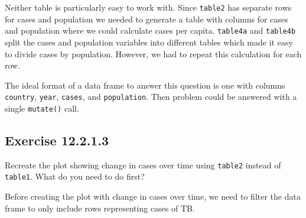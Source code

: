 \documentclass[]{book}
\newenvironment{Shaded}{\begin{snugshade}}{\end{snugshade}}
\newcommand{\CommentTok}[1]{\textcolor[rgb]{0.56,0.35,0.01}{\textit{#1}}}
\newcommand{\DataTypeTok}[1]{\textcolor[rgb]{0.13,0.29,0.53}{#1}}
\newcommand{\DecValTok}[1]{\textcolor[rgb]{0.00,0.00,0.81}{#1}}
\newcommand{\KeywordTok}[1]{\textcolor[rgb]{0.13,0.29,0.53}{\textbf{#1}}}
\newcommand{\NormalTok}[1]{#1}
\newcommand{\OperatorTok}[1]{\textcolor[rgb]{0.81,0.36,0.00}{\textbf{#1}}}
\newcommand{\StringTok}[1]{\textcolor[rgb]{0.31,0.60,0.02}{#1}}
\theoremstyle{plain}
\theoremstyle{remark}
\begin{document}
\begin{Shaded}
\end{Shaded}

Neither table is particularly easy to work with.
Since \texttt{table2} has separate rows for cases and population we needed to generate a table with columns for cases and population where we could
calculate cases per capita.
\texttt{table4a} and \texttt{table4b} split the cases and population variables into different tables which
made it easy to divide cases by population.
However, we had to repeat this calculation for each row.

The ideal format of a data frame to answer this question is one with columns \texttt{country}, \texttt{year}, \texttt{cases}, and \texttt{population}.
Then problem could be answered with a single \texttt{mutate()} call.

\hypertarget{exercise-12.2.1.3}{%
\subsection*{\texorpdfstring{Exercise {12.2.1.3}}{Exercise 12.2.1.3}}\label{exercise-12.2.1.3}}

Recreate the plot showing change in cases over time using \texttt{table2} instead of \texttt{table1}. What do you need to do first?

Before creating the plot with change in cases over time, we need to filter the data frame to only include rows representing cases of TB.
\end{document}
